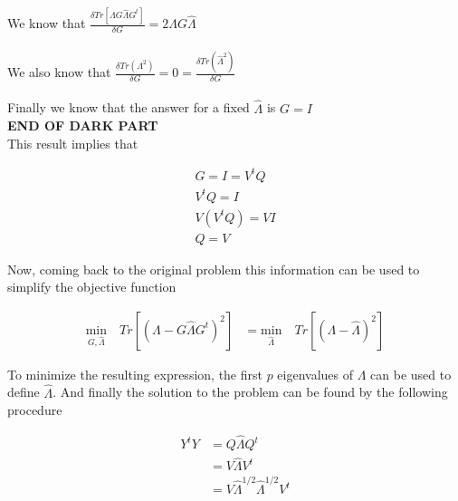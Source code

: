 \documentclass[12pt,journal]{IEEEtran}
\begin{document}
    We know that $\frac{\delta Tr[\Lambda G \hat{\Lambda} G^t]}{\delta G} = 2\Lambda G \hat{\Lambda}$\\\\
    We also know that $\frac{\delta Tr(\Lambda^2)}{\delta G} = 0 = \frac{\delta Tr(\hat{\Lambda}^2)}{\delta G}$\\\\
    Finally we know that the answer for a fixed $\hat{\Lambda}$ is $G=I$\\

    \textbf{END OF DARK PART}\\

    This result implies that

    \begin{equation*}
        \begin{aligned}
        G = I = V^tQ\\
        V^tQ = I\\
        V(V^tQ) = VI\\
        Q = V
        \end{aligned}
    \end{equation*}

    Now, coming back to the original problem this information can be used to
    simplify the objective function

    \begin{equation*}
        \begin{aligned}
            \underset{G,\hat{\Lambda}}{\text{min}} \quad Tr[(\Lambda - G \hat{\Lambda} G^t)^2]
            &=
            \underset{\hat{\Lambda}}{\text{min}} \quad Tr[(\Lambda - \hat{\Lambda})^2]
        \end{aligned}
    \end{equation*}

    To minimize the resulting expression, the first $p$ eigenvalues of $\Lambda$
    can be used to define $\hat{\Lambda}$. And finally the solution to the
    problem can be found by the following procedure

    \begin{equation*}
        \begin{aligned}
            Y^tY &= Q \hat{\Lambda} Q^t\\
            &=
            V \hat{\Lambda} V^t\\
            &=
            V \hat{\Lambda}^{1/2} \hat{\Lambda}^{1/2} V^t\\
        \end{aligned}
    \end{equation*}
\end{document}
